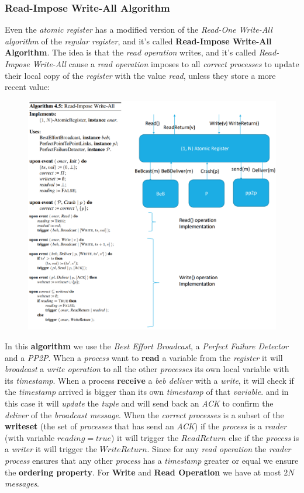 \documentclass{article}
\begin{document}
\subsubsection{Read-Impose Write-All Algorithm}
Even the \emph{atomic register} has a modified version of the \emph{Read-One Write-All algorithm} of the \emph{regular register}, and it's called \textbf{Read-Impose Write-All Algorithm}. The idea is that the \emph{read operation} writes, and it's called \emph{Read-Impose Write-All} cause a \emph{read operation} imposes to all \emph{correct processes} to update their local copy of the \emph{register} with the value \emph{read}, unless they store a more recent value:
\begin{figure}[H]
  \centering
  \includegraphics[scale=0.85,left]{cattura73.png}
\end{figure}
\clearpage
In this \textbf{algorithm} we use the \emph{Best Effort Broadcast}, a \emph{Perfect Failure Detector} and a\emph{ PP2P}. When a \emph{process} want to \textbf{read} a variable from the \emph{register} it will \emph{broadcast} a \emph{write operation} to all the other \emph{processes} its own local variable with its \emph{timestamp}. When a process \textbf{receive} a \emph{beb deliver} with a \emph{write}, it will check if the \emph{timestamp} arrived is bigger than its own \emph{timestamp} of that \emph{variable}. and in this case it will \emph{update} the \emph{tuple} and will send back an \emph{ACK} to confirm the \emph{deliver} of the \emph{broadcast message}. When the \emph{correct processes} is a subset of the \textbf{writeset} (the set of \emph{processes} that has send an \emph{ACK}) if the \emph{process} is a \emph{reader} (with variable $reading=true$) it will trigger the $ReadReturn$ else if the \emph{process} is a \emph{writer} it will trigger the $WriteReturn$. Since for any \emph{read operation} the \emph{reader process} ensures that any other \emph{process} has a \emph{timestamp} greater or equal we ensure the \textbf{ordering property}. For \textbf{Write} and \textbf{Read Operation} we have at most $2N$ \emph{messages}.
\end{document}
